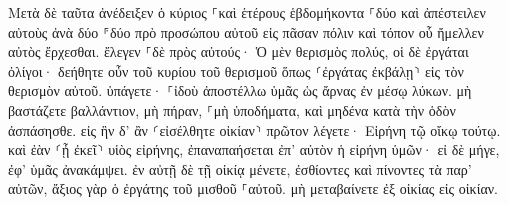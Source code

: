 \documentclass{openreader}
\begin{document}
Μετὰ δὲ ταῦτα ἀνέδειξεν ὁ κύριος ⸀καὶ ἑτέρους ἑβδομήκοντα ⸀δύο καὶ ἀπέστειλεν αὐτοὺς ἀνὰ δύο ⸁δύο πρὸ προσώπου αὐτοῦ εἰς πᾶσαν πόλιν καὶ τόπον οὗ ἤμελλεν αὐτὸς ἔρχεσθαι. 
ἔλεγεν ⸀δὲ πρὸς αὐτούς· Ὁ μὲν θερισμὸς πολύς, οἱ δὲ ἐργάται ὀλίγοι· δεήθητε οὖν τοῦ κυρίου τοῦ θερισμοῦ ὅπως ⸂ἐργάτας ἐκβάλῃ⸃ εἰς τὸν θερισμὸν αὐτοῦ. 
ὑπάγετε· ⸀ἰδοὺ ἀποστέλλω ὑμᾶς ὡς ἄρνας ἐν μέσῳ λύκων. 
μὴ βαστάζετε βαλλάντιον, μὴ πήραν, ⸀μὴ ὑποδήματα, καὶ μηδένα κατὰ τὴν ὁδὸν ἀσπάσησθε. 
εἰς ἣν δ’ ἂν ⸂εἰσέλθητε οἰκίαν⸃ πρῶτον λέγετε· Εἰρήνη τῷ οἴκῳ τούτῳ. 
καὶ ἐὰν ⸂ᾖ ἐκεῖ⸃ υἱὸς εἰρήνης, ἐπαναπαήσεται ἐπ’ αὐτὸν ἡ εἰρήνη ὑμῶν· εἰ δὲ μήγε, ἐφ’ ὑμᾶς ἀνακάμψει. 
ἐν αὐτῇ δὲ τῇ οἰκίᾳ μένετε, ἐσθίοντες καὶ πίνοντες τὰ παρ’ αὐτῶν, ἄξιος γὰρ ὁ ἐργάτης τοῦ μισθοῦ ⸀αὐτοῦ. μὴ μεταβαίνετε ἐξ οἰκίας εἰς οἰκίαν. 
\end{document}
